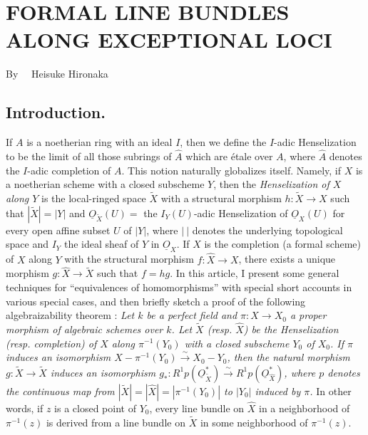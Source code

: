 \chapter[\textsc{H. Hironaka~:} Formal Line Bundles along Exceptional Loci]{FORMAL LINE BUNDLES ALONG EXCEPTIONAL LOCI}\label{art10}

\begin{center}
By~~ Heisuke Hironaka
\end{center}

\setcounter{pageoriginal}{200}
\section*{Introduction.}\pageoriginale


If $A$ is a noetherian ring with an ideal $I$, then we define the $I$-adic Henselization to be the limit of all those subrings of $\widehat{A}$ which are \'etale over $A$, where $\widehat{A}$ denotes the $I$-adic completion of $A$. This notion naturally globalizes itself. Namely, if $X$ is a noetherian scheme with a closed subscheme $Y$, then the {\em Henselization of $X$ along $Y$} is the local-ringed space $\widetilde{X}$ with a structural morphism $h:\widetilde{X}\to X$ such that $|\widetilde{X}|=|Y|$ and $\underline{O}_{\widetilde{X}}(U)=$ the $I_{Y}(U)$-adic Henselization of $\underline{O}_{X}(U)$ for every open affine subset $U$ of $|Y|$, where $|~|$ denotes the underlying topological space and $I_{Y}$ the ideal sheaf of $Y$ in $\underline{O}_{X}$. If $\widehat{X}$ is the completion (a formal scheme) of $X$ along $Y$ with the structural morphism $f:\widehat{X}\to X$, there exists a unique morphism $g:\widehat{X}\to \widetilde{X}$ such that $f=hg$. In this article, I present some general techniques for ``equivalences of homomorphisms'' with special short accounts in various special cases, and then briefly sketch a proof of the following algebraizability theorem : {\em Let $k$ be a perfect field and $\pi:X\to X_{0}$ a proper morphism of algebraic schemes over $k$. Let $\widetilde{X}$ (resp. $\widehat{X}$) be the Henselization (resp. completion) of $X$ along $\pi^{-1}(Y_{0})$ with a closed subscheme $Y_{0}$ of $X_{0}$. If $\pi$ induces an isomorphism $X-\pi^{-1}(Y_{0})\xrightarrow{\sim}X_{0}-Y_{0}$, then the natural morphism $g:\widetilde{X}\to \widetilde{X}$ induces an isomorphism $g_{*}:R^{1}p(\underline{O}_{\widetilde{X}}^{*})\xrightarrow{\sim}R^{1}p(\underline{O}_{\widehat{X}}^{*})$, where $p$ denotes the continuous map from $|\widetilde{X}|=|\widehat{X}|=|\pi^{-1}(Y_{0})|$ to $|Y_{0}|$ induced by $\pi$.} In other words, if $z$ is a closed point of $Y_{0}$, every line bundle on $\widehat{X}$ in a neighborhood of $\pi^{-1}(z)$ is derived from a line bundle on $\widetilde{X}$ in some neighborhood of $\pi^{-1}(z)$.

